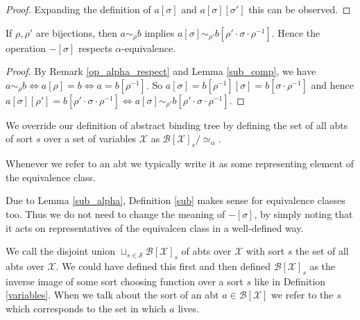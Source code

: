 \begin{proof}
    Expanding the definition of $a[\sigma]$ and $a[\sigma][\sigma']$ this can be observed.
\end{proof}

\begin{lemma}\label{sub_alpha}
    If $\rho, \rho'$ are bijections, then $a \sim_\rho b$ implies $a[\sigma] \sim_{\rho'} b[\rho ' \cdot \sigma \cdot \rho^{-1}]$. Hence the operation $-[\sigma]$ respects $\alpha$-equivalence.
\end{lemma}

\begin{proof}
    By Remark \ref{op_alpha_respect} and Lemma \ref{sub_comp}, we have $a \sim_\rho b \iff a[\rho] = b \iff a = b[\rho^{-1}]$. So $a[\sigma] = b[\rho^{-1}][\sigma]=b[\sigma \cdot \rho^{-1}]$ and hence  $a[\sigma][\rho']=b[\rho' \cdot \sigma \cdot \rho^{-1}]\iff a[\sigma] \sim_{\rho'} b[\rho' \cdot \sigma \cdot \rho^{-1}]$.
\end{proof}

%
\begin{defin}
    We override our definition of abstract binding tree by defining the set of all abts of sort $s$ over a set of variables $\mathcal{X}$ as $\mathcal{B}[\mathcal{X}]_s / \simeq_{\alpha}$.
\end{defin}

\begin{remark}
    Whenever we refer to an abt we typically write it as some representing element of the equivalence class.
\end{remark}

\begin{remark}
    Due to Lemma \ref{sub_alpha}, Definition \ref{sub} makes sense for equivalence classes too. Thus we do not need to change the meaning of $-[\sigma]$, by simply noting that it acts on representatives of the equivalcen class in a well-defined way.
\end{remark}

\begin{defin}
    We call the disjoint union $\sqcup_{s \in \mathcal{S}} \mathcal{B}[\mathcal{X}]_s$ of abts over $\mathcal{X}$ with sort $s$ the set of all abts over $\mathcal{X}$. We could have defined this first and then defined $\mathcal{B}[\mathcal{X}]_s$ as the inverse image of some sort choosing function over a sort $s$ like in Definition \ref{variables}. When we talk about the sort of an abt $a \in \mathcal{B}[\mathcal{X}]$ we refer to the $s$ which corresponds to the set in which $a$ lives. 
\end{defin}






